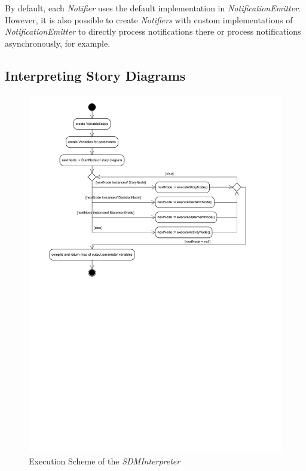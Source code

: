 By default, each \emph{Notifier} uses the default implementation in \emph{NotificationEmitter}. 
However, it is also possible to create \emph{Notifiers} with custom implementations of \emph{NotificationEmitter} to directly process notifications there or process notifications asynchronously, for example.


\subsection{Interpreting Story Diagrams}

\begin{figure}[htb]
\center
\includegraphics[scale=0.7]{figures/SDInterpreterExecution.pdf} 
\caption{Execution Scheme of the \emph{SDMInterpreter}}
\label{fig:sdmInterpreter_execution_scheme}
\end{figure}


